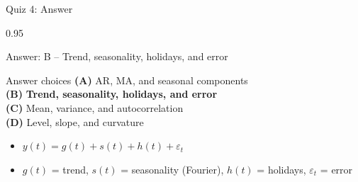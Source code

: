 \documentclass[9pt, aspectratio=169, t]{beamer}
\begin{document}
\begin{frame}{Quiz 4: Answer}
    \begin{cminipage}{0.95\textwidth}
    \begin{exampleblock}{Answer: B -- Trend, seasonality, holidays, and error}

    \begin{block}{Answer choices}
        \textcolor{MainBlue}{\textbf{(A)}} AR, MA, and seasonal components \incorrect\\[3pt]
        \textcolor{MainBlue}{\textbf{(B)}} \textbf{\textcolor{Forest}{Trend, seasonality, holidays, and error}} \correct\\[3pt]
        \textcolor{MainBlue}{\textbf{(C)}} Mean, variance, and autocorrelation \incorrect\\[3pt]
        \textcolor{MainBlue}{\textbf{(D)}} Level, slope, and curvature \incorrect
    \end{block}

        \vspace{0.3cm}

        \begin{itemize}
            \item $y(t) = g(t) + s(t) + h(t) + \varepsilon_t$
            \item $g(t)$ = trend, $s(t)$ = seasonality (Fourier), $h(t)$ = holidays, $\varepsilon_t$ = error
        \end{itemize}
    \end{exampleblock}

    \end{cminipage}
\end{frame}
\end{document}
